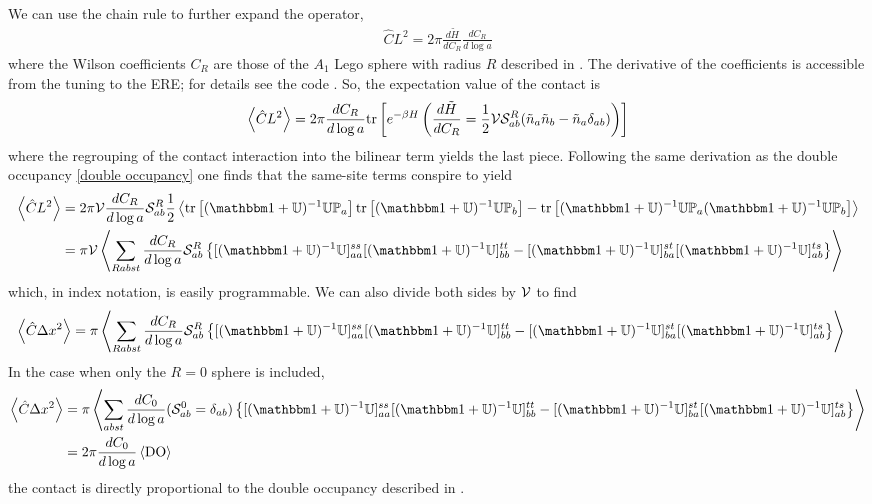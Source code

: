 We can use the chain rule to further expand the operator,
\begin{align}
    \hat{C}L^2 = 2\pi \frac{d\tilde{H}}{d C_R} \frac{d C_R}{d\log a} 
\end{align}
where the Wilson coefficients $C_R$ are those of the $A_1$ Lego sphere with radius $R$ described in .
The derivative of the coefficients is accessible from the tuning to the ERE; for details see the code .
So, the expectation value of the contact is
\begin{align}
    \left\langle \hat{C} L^2 \right\rangle
    = 2 \pi \frac{d C_R}{d\log a} \text{tr}\left[e^{-\beta H} \left(\frac{d\tilde{H}}{d C_R} = \frac{1}{2} \mathcal{V} \mathcal{S}^{R}_{ab} (\tilde{n}_a \tilde{n}_b - \tilde{n}_a \delta_{ab}) \right)\right]
    \label{eq:contact generic}
\end{align}
where the regrouping of the contact interaction into the bilinear term yields the last piece.
Following the same derivation as the double occupancy \eqref{double occupancy} one finds that the same-site terms conspire to yield
\begin{align}
    \expectation{\hat{C} L^2}
    &= 2 \pi \Volume \frac{d C_R}{d\log a} \LegoSphere{R}_{ab} \half\expectation{\tr{(\one + \UU)\inverse \UU \PP_a}\tr{(\one + \UU)\inverse \UU \PP_b} - \tr{(\one+\UU)\inverse \UU \PP_a (\one+\UU)\inverse \UU \PP_b}}
    \nonumber\\
    &= \pi\Volume \expectation{\sum_{Rabst} \frac{d C_R}{d\log a} \LegoSphere{R}_{ab} \left\{[(\one+\UU)\inverse \UU]^{ss}_{aa} [(\one+\UU)\inverse \UU]^{tt}_{bb} - [(\one+\UU)\inverse \UU]^{st}_{ba} [(\one+\UU)\inverse \UU]^{ts}_{ab} \right\}}
\end{align}
which, in index notation, is easily programmable.
We can also divide both sides by $\mathcal{V}$ to find
\begin{align}
    \expectation{\hat{C} \Delta x^2}
    &= \pi \expectation{\sum_{Rabst} \frac{d C_R}{d\log a} \LegoSphere{R}_{ab} \left\{[(\one+\UU)\inverse \UU]^{ss}_{aa} [(\one+\UU)\inverse \UU]^{tt}_{bb} - [(\one+\UU)\inverse \UU]^{st}_{ba} [(\one+\UU)\inverse \UU]^{ts}_{ab} \right\}}
\end{align}
In the case when only the $R=0$ sphere is included,
\begin{align}
    \expectation{\hat{C} \Delta x^2}
    &= \pi \expectation{\sum_{abst} \frac{d C_0}{d\log a} (\LegoSphere{0}_{ab} = \delta_{ab}) \left\{[(\one+\UU)\inverse \UU]^{ss}_{aa} [(\one+\UU)\inverse \UU]^{tt}_{bb} - [(\one+\UU)\inverse \UU]^{st}_{ba} [(\one+\UU)\inverse \UU]^{ts}_{ab} \right\}}
    \nonumber\\
    &= 2\pi \frac{d C_0}{d\log a} \expectation{ \DoubleOccupancy }
\end{align}
the contact is directly proportional to the double occupancy described in .

